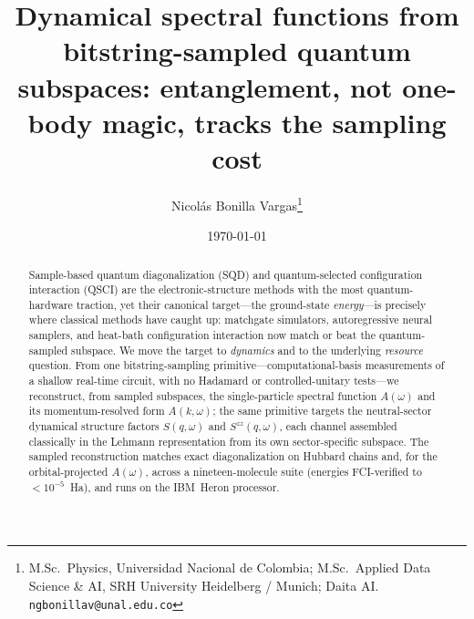 \documentclass[11pt]{article}
\title{\vspace{-1.2cm}\bfseries Dynamical spectral functions from bitstring-sampled quantum subspaces:
entanglement, not one-body magic, tracks the sampling cost}
\author{Nicol\'as Bonilla Vargas\thanks{M.Sc.\ Physics, Universidad Nacional de Colombia;
M.Sc.\ Applied Data Science \& AI, SRH University Heidelberg / Munich; Daita AI.
\texttt{ngbonillav@unal.edu.co}}}
\date{\today}
\begin{document}
\maketitle

\begin{abstract}\noindent
Sample-based quantum diagonalization (SQD) and quantum-selected configuration interaction (QSCI) are
the electronic-structure methods with the most quantum-hardware traction, yet their canonical
target---the ground-state \emph{energy}---is precisely where classical methods have caught up:
matchgate simulators, autoregressive neural samplers, and heat-bath configuration interaction now
match or beat the quantum-sampled subspace. We move the target to \emph{dynamics} and to the
underlying \emph{resource} question. From one bitstring-sampling primitive---computational-basis
measurements of a shallow real-time circuit, with no Hadamard or controlled-unitary tests---we
reconstruct, from sampled subspaces, the single-particle spectral function $A(\omega)$ and its
momentum-resolved form $A(k,\omega)$; the same primitive targets the neutral-sector dynamical structure
factors $S(q,\omega)$ and $S^{zz}(q,\omega)$, each channel assembled classically in the Lehmann
representation from its own sector-specific subspace. The sampled reconstruction matches exact
diagonalization on Hubbard chains and, for the orbital-projected
$A(\omega)$, across a nineteen-molecule suite (energies FCI-verified to $<10^{-5}$~Ha), and runs on the
IBM~Heron processor.


\end{abstract}
\end{document}

